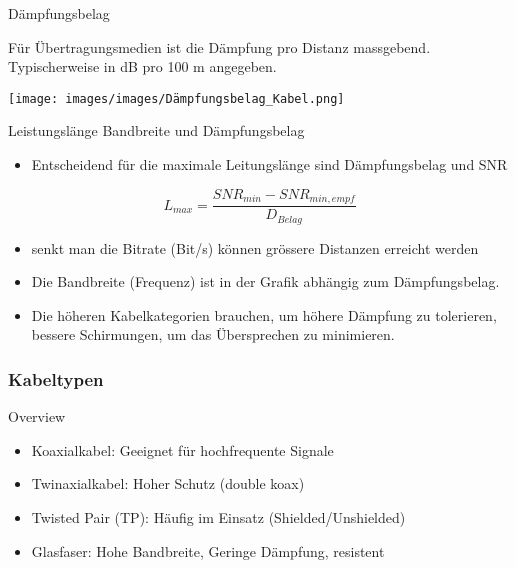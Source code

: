     \begin{definition}{Dämpfungsbelag}\\
        \begin{minipage}{0.35\linewidth}
        Für Übertragungsmedien ist die Dämpfung pro Distanz massgebend. Typischerweise in dB pro 100 m angegeben. \\
        \end{minipage}
        \begin{minipage}{0.6\linewidth}
            \begin{center}
            \texttt{[image: images/images/Dämpfungsbelag\_Kabel.png]}
            \end{center}
        \end{minipage}
    \end{definition}

    \begin{concept}{Leistungslänge Bandbreite und Dämpfungsbelag}
        \begin{itemize}
            \item Entscheidend für die maximale Leitungslänge sind Dämpfungsbelag und SNR
        \end{itemize}
        $$L_{max} = \frac{SNR_{min} - SNR_{min,empf}}{D_{Belag}}$$
        \begin{itemize}
            \item senkt man die Bitrate (Bit/s) können grössere Distanzen erreicht werden
            \item Die Bandbreite (Frequenz) ist in der Grafik abhängig zum Dämpfungsbelag.
            \item Die höheren Kabelkategorien brauchen, um höhere Dämpfung zu tolerieren, bessere Schirmungen, um das Übersprechen zu minimieren.
        \end{itemize}
    \end{concept}

    

    \subsubsection{Kabeltypen}
    \begin{concept}{Overview}
        \begin{itemize}
            \item Koaxialkabel: Geeignet für hochfrequente Signale
            \item Twinaxialkabel: Hoher Schutz (double koax)
            \item Twisted Pair (TP): Häufig im Einsatz (Shielded/Unshielded)
            \item Glasfaser: Hohe Bandbreite, Geringe Dämpfung, resistent
        \end{itemize}        
    \end{concept}

